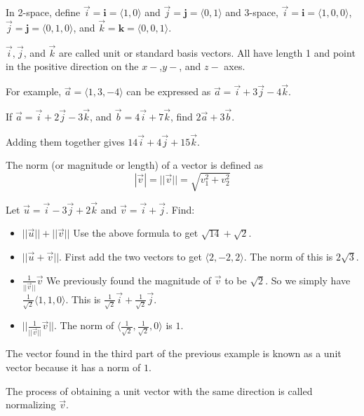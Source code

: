 \documentclass[../calc3.tex]{subfiles}
\begin{document}
In 2-space, define $\vec{i}=\textbf{i}=\langle 1,0\rangle$ and $\vec{j}=\textbf{j}=\langle 0,1\rangle$ and 3-space, $\vec{i}=\textbf{i}=\langle 1,0,0\rangle$, $\vec{j}=\textbf{j}
=\langle 0,1,0\rangle$, and $\vec{k}=\textbf{k}=\langle 0,0,1\rangle$.

$\vec{i},\vec{j}$, and $\vec{k}$ are called unit or standard basis vectors. All have length 1 and point in the positive direction on the $x-$,$y-$, and $z-$ axes.

For example, $\vec{a}=\langle 1,3,-4\rangle$ can be expressed as $\vec{a}=\vec{i}+3\vec{j}-4\vec{k}$.

\begin{example}
    If $\vec{a}=\vec{i}+2\vec{j}-3\vec{k}$, and $\vec{b}=4\vec{i}+7\vec{k}$, find $2\vec{a}+3\vec{b}$.

    Adding them together gives $14\vec{i}+4\vec{j}+15\vec{k}$.
\end{example}

The norm (or magnitude or length) of a vector is defined as 
\[ |\vec{v}|=||\vec{v}||=\sqrt{v_1^2 + v_2^2} \]

\begin{example}
    Let $\vec{u}=\vec{i}-3\vec{j}+2\vec{k}$ and $\vec{v}=\vec{i}+\vec{j}$. Find: 
    \begin{itemize}
        \item $||\vec{u}||+||\vec{v}||$
        Use the above formula to get $\sqrt{14}+\sqrt{2}$.

        \item $||\vec{u}+\vec{v}||$.
        First add the two vectors to get $\langle 2,-2,2\rangle$. The norm of this is $2\sqrt{3}$.

        \item $\frac{1}{||\vec{v}||}\vec{v}$
        We previously found the magnitude of $\vec{v}$ to be $\sqrt{2}$. So we simply have $\frac{1}{\sqrt{2}}\langle 1,1,0\rangle$. This is $\frac{1}{\sqrt{2}}\vec{i}+\frac{1}{\sqrt{2}}\vec{j}$.
    
        \item $||\frac{1}{||\vec{v}||}\vec{v}||$.
        The norm of $\langle \frac{1}{\sqrt{2}},\frac{1}{\sqrt{2}},0\rangle$ is $1$.
    \end{itemize}
\end{example}
The vector found in the third part of the previous example is known as a unit vector because it has a norm of $1$.

The process of obtaining a unit vector with the same direction is called normalizing $\vec{v}$.
\end{document}
